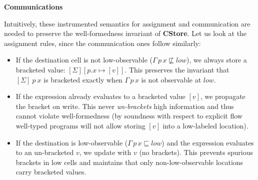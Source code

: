 \documentclass[12pt,a4paper,twoside]{book}
\begin{document}
\noindent\textbf{Communications}
\begin{mathpar}


\end{mathpar}

Intuitively, these instrumented semantics for assignment and communication are needed to preserve the well-formedness invariant of \textbf{CStore}.
Let us look at the assignment rules, since the communication ones follow similarly:
\begin{itemize}
\item If the destination cell is not low-observable (\(\Gamma\,p\,x \not\sqsubseteq low\)), we always store a bracketed value: \([\Sigma][p.x \mapsto [v]]\). This preserves the invariant that \([\Sigma]~p~x\) is bracketed exactly when \(\Gamma\,p\,x\) is not observable at \(low\).
\item If the expression already evaluates to a bracketed value \([v]\), we propagate the bracket on write. This never \emph{un-brackets} high information and thus cannot violate well-formedness (by soundness with respect to explicit flow well-typed programs will not allow storing \([v]\) into a low-labeled location).
\item If the destination is low-observable (\(\Gamma\,p\,x \sqsubseteq low\)) and the expression evaluates to an un-bracketed \(v\), we update with \(v\) (no brackets). This prevents spurious brackets in low cells and maintains that only non-low-observable locations carry bracketed values.
\end{itemize}
\end{document}
